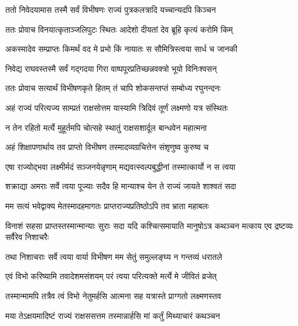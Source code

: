 \twolineshloka
{ततो निवेदयामास तस्मै सर्वं विभीषणः}
{राज्यं पुत्रकलत्रादि यच्चान्यदपि किञ्चन}%

\twolineshloka
{ततः प्रोवाच विनयात्कृताञ्जलिपुटः स्थितः}
{आदेशो दीयतां देव ब्रूहि कृत्यं करोमि किम्}%

\twolineshloka
{अकस्मादेव सम्प्राप्तः किमर्थं वद मे प्रभो}
{किं नायातः स सौमित्रिस्त्वया सार्ध च जानकी}%


\twolineshloka
{निवेद्य राघवस्तस्मै सर्वं गद्गदया गिरा}
{वाष्पपूरप्रतिच्छन्नवक्त्रो भूयो विनिःश्वसन्}%

\twolineshloka
{ततः प्रोवाच सत्यार्थं विभीषणकृते हितम्}
{तं चापि शोकसन्तप्तं सम्बोध्य रघुनन्दनः}%

\twolineshloka
{अहं राज्यं परित्यज्य साम्प्रतं राक्षसोत्तम}
{यास्यामि त्रिदिवं तूर्णं लक्ष्मणो यत्र संस्थितः}%

\twolineshloka
{न तेन रहितो मर्त्ये मुहूर्तमपि चोत्सहे}
{स्थातुं राक्षसशार्दूल बान्धवेन महात्मना}%

\twolineshloka
{अहं शिक्षापणार्थाय तव प्राप्तो विभीषण}
{तस्मादव्यग्रचित्तेन संशृणुष्व कुरुष्व च}%

\twolineshloka
{एषा राज्योद्भवा लक्ष्मीर्मदं सञ्जनयेन्नृणाम्}
{मद्यवत्स्वल्पबुद्धीनां तस्मात्कार्यो न स त्वया}%

\twolineshloka
{शक्राद्या अमराः सर्वे त्वया पूज्याः सदैव हि}
{मान्याश्च येन ते राज्यं जायते शाश्वतं सदा}%

\twolineshloka
{मम सत्यं भवेद्वाक्य मेतस्मादहमागतः}
{प्राप्तराज्यप्रतिष्ठोऽपि तव भ्राता महाबलः}%

\threelineshloka
{विनाशं सहसा प्राप्तस्तस्मान्मान्याः सुराः सदा}
{यदि कश्चित्समायाति मानुषोऽत्र कथञ्चन}
{मत्काय एव द्रष्टव्यः सर्वैरेव निशाचरैः}%

\twolineshloka
{तथा निशाचराः सर्वे त्वया वार्या विभीषण}
{मम सेतुं समुल्लङ्घ्य न गन्तव्यं धरातले}%


\twolineshloka
{एवं विभो करिष्यामि तवादेशमसंशयम्}
{परं त्वया परित्यक्ते मर्त्ये मे जीवितं व्रजेत्}%

\twolineshloka
{तस्मान्मामपि तत्रैव त्वं विभो नेतुमर्हसि}
{आत्मना सह यत्रास्ते प्राग्गतो लक्ष्मणस्तव}%


\twolineshloka
{मया तेऽक्षयमादिष्टं राज्यं राक्षससत्तम}
{तस्मान्नार्हसि मां कर्तुं मिथ्याचारं कथञ्चन}%

